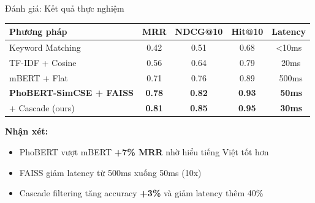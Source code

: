 \documentclass[aspectratio=169,xcolor=dvipsnames, t]{beamer}
\begin{document}
\begin{frame}{Đánh giá: Kết quả thực nghiệm}
\justifying

\begin{table}[H]
\centering
\small
\begin{tabular}{|l|c|c|c|c|}
\hline
\textbf{Phương pháp} & \textbf{MRR} & \textbf{NDCG@10} & \textbf{Hit@10} & \textbf{Latency} \\
\hline
Keyword Matching & 0.42 & 0.51 & 0.68 & <10ms \\
\hline
TF-IDF + Cosine & 0.56 & 0.64 & 0.79 & ~20ms \\
\hline
mBERT + Flat & 0.71 & 0.76 & 0.89 & ~500ms \\
\hline
\textbf{PhoBERT-SimCSE + FAISS} & \textbf{0.78} & \textbf{0.82} & \textbf{0.93} & \textbf{~50ms} \\
\hline
+ Cascade (ours) & \textbf{0.81} & \textbf{0.85} & \textbf{0.95} & \textbf{~30ms} \\
\hline
\end{tabular}
\end{table}

\vspace{0.2cm}
\textbf{Nhận xét:}
\begin{itemize}
    \item PhoBERT vượt mBERT \textbf{+7\% MRR} nhờ hiểu tiếng Việt tốt hơn
    \item FAISS giảm latency từ 500ms xuống 50ms (10x)
    \item Cascade filtering tăng accuracy \textbf{+3\%} và giảm latency thêm 40\%
\end{itemize}

\end{frame}





\end{document}
